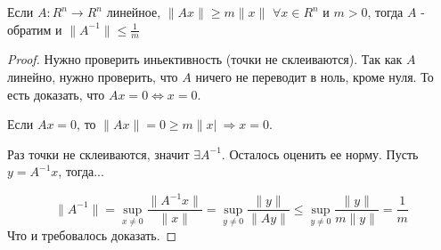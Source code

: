 
\begin{theorem} \thmslashn

	Если $A : R^n \rightarrow R^n$ линейное, $\|Ax \| \geq m\|x\|$ $\forall x \in R^n$ и $m>0$, тогда $A$ - обратим и $\|A^{-1}\| \leq \frac{1}{m}$
	\begin{proof} \thmslashn

		Нужно проверить иньективность (точки не склеиваются). Так как $A$ линейно, нужно проверить, что $A$ ничего не переводит в ноль, кроме нуля. То есть доказать, что $Ax = 0 \iff x = 0$.
		
		Если $Ax = 0$, то $\|Ax\| = 0 \geq m\|x|\ \Rightarrow x = 0$.
		
		Раз точки не склеиваются, значит $\exists A^{-1}$. Осталось оценить ее норму. Пусть $y = A^{-1}x$, тогда...
		
		$$
		\|A^{-1}\|
		=
		\sup_{x\neq0}\frac{\|A^{-1}x\|}{\|x\|}
		=
		\sup_{y\neq0}\frac{\|y\|}{\|Ay\|}
		\leq
		\sup_{y\neq0}\frac{\|y\|}{m\|y\|}
		=
		\frac{1}{m}
		$$
		Что и требовалось доказать.
	\end{proof}
\end{theorem}

